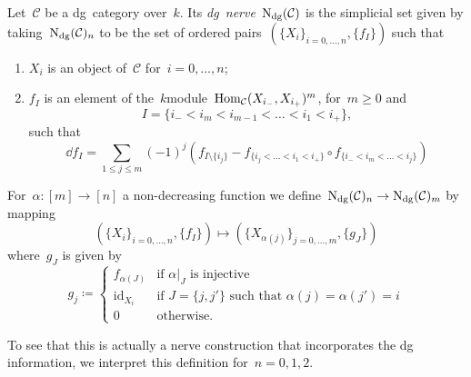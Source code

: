 \begin{definition}
  \label{definition:dg-nerve}
  Let~$\mathcal{C}$ be a dg~category over~$k$. Its \emph{dg~nerve}~$\operatorname{N}_{\mathrm{dg}}(\mathcal{C})$ is the simplicial set given by taking~$\operatorname{N}_{\mathrm{dg}}(\mathcal{C})_n$ to be the set of ordered pairs~$(\{X_i\}_{i=0,\dotsc,n},\{f_I\})$ such that
  \begin{enumerate}
    \item $X_i$ is an object of~$\mathcal{C}$ for~$i=0,\dotsc,n$;
    \item $f_I$ is an element of the~$k$\dash module~$\mathrm{Hom}_{\mathcal{C}}(X_{i_-},X_{i_+})^m$, for~$m\geq 0$ and
      \begin{equation}
        I=\{i_-<i_m<i_{m-1}<\dotso<i_1<i_+\},
      \end{equation}
      such that
      \begin{equation}
        \dd f_I=\sum_{1\leq j\leq m}(-1)^j\left( f_{I\setminus\{i_j\}}-f_{\{i_j<\dotso<i_1<i_+\}}\circ f_{\{i_-<i_m<\dotso<i_j\}} \right)
      \end{equation}
  \end{enumerate}
  For~$\alpha\colon[m]\to[n]$ a non-decreasing function we define~$\operatorname{N}_{\mathrm{dg}}(\mathcal{C})_n\to\operatorname{N}_{\mathrm{dg}}(\mathcal{C})_m$ by mapping
  \begin{equation}
    \left( \{X_i\}_{i=0,\dotsc,n},\{f_I\} \right)\mapsto\left( \{X_{\alpha(j)}\}_{j=0,\dotsc,m},\{g_J\} \right)
  \end{equation}
  where~$g_J$ is given by
  \begin{equation}
    g_j\coloneqq
    \begin{cases}
      f_{\alpha(J)} & \text{if~$\alpha|_J$ is injective} \\
      \mathrm{id}_{X_i} & \text{if~$J=\{j,j'\}$ such that~$\alpha(j)=\alpha(j')=i$} \\
      0 & \text{otherwise}.
    \end{cases}
  \end{equation}
\end{definition}
To see that this is actually a nerve construction that incorporates the dg information, we interpret this definition for~$n=0,1,2$.

